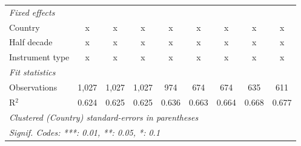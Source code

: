 \begin{tabular}{lcccccccc}
   \emph{Fixed effects}\\
   Country                                                             & x           & x           & x           & x            & x              & x              & x             & x\\  
   Half decade                                                         & x           & x           & x           & x            & x              & x              & x             & x\\  
   Instrument type                                                     & x           & x           & x           & x            & x              & x              & x             & x\\  
   \midrule \emph{Fit statistics}\\
   Observations                                                        & 1,027       & 1,027       & 1,027       & 974          & 674            & 674            & 635           & 611\\  
   R$^2$                                                               & 0.624       & 0.625       & 0.625       & 0.636        & 0.663          & 0.664          & 0.668         & 0.677\\  
   \midrule
   \multicolumn{9}{l}{\emph{Clustered (Country) standard-errors in parentheses}}\\
   \multicolumn{9}{l}{\emph{Signif. Codes: ***: 0.01, **: 0.05, *: 0.1}}\\
\end{tabular}
\par\endgroup



